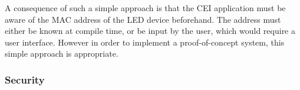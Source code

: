\documentclass[Main]{subfiles}
\begin{document}
				A consequence of such a simple approach is that the CEI application must be aware of the MAC address of the LED device beforehand. 
				The address must either be known at compile time, or be input by the user, which would require a user interface. 
				However in order to implement a proof-of-concept system, this simple approach is appropriate. 


			\subsubsection{Security}

			





\end{document}
